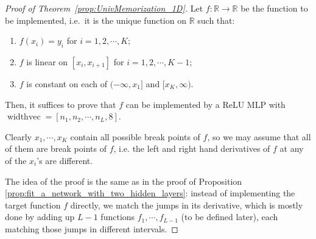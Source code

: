 \documentclass{article}
\numberwithin{equation}{section}
\theoremstyle{definition}
\begin{document}
\begin{proof}[{Proof of Theorem~\ref{prop:UnivMemorization_1D}}]
Let $f:\mathbb{R}\rightarrow\mathbb{R}$ be the function to be implemented, i.e.\ it is the unique function on $\mathbb{R}$ such that:
\begin{enumerate}
    \item $f(x_i)=y_i$ for $i=1,2,\cdots,K$;
    \item $f$ is linear on $[x_i,x_{i+1}]$ for $i=1,2,\cdots,K-1$;
    \item $f$ is constant on each of $(-\infty,x_1]$ and $[x_K,\infty)$.
\end{enumerate}
Then, it suffices to prove that $f$ can be implemented by a ReLU MLP with $\operatorname{widthvec}=[n_1,n_2,\cdots,n_L,8]$.

Clearly $x_1,\cdots,x_K$ contain all possible break points of $f$, so we may assume that all of them are break points of $f$, i.e. the left and right hand derivatives of $f$ at any of the $x_i$'s are different. 


The idea of the proof is the same as in the proof of Proposition \ref{prop:fit_a_network_with_two_hidden_layers}: instead of implementing the target function $f$ directly, we match the jumps in its derivative, which is mostly done by adding up $L-1$ functions $f_1,\cdots,f_{L-1}$ (to be defined later), each matching those jumps in different intervals. 


\end{proof}
\end{document}
